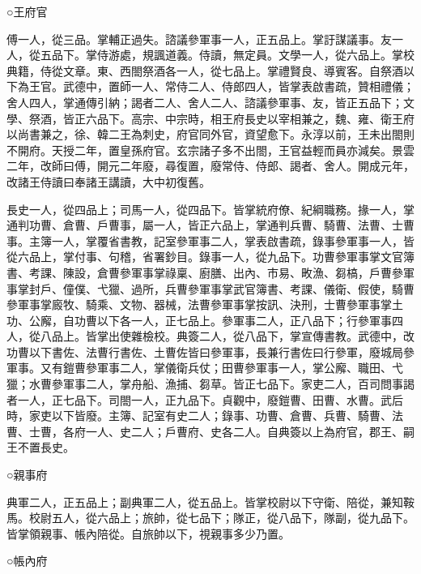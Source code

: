 
\begin{pinyinscope}

 ○王府官



 傅一人，從三品。掌輔正過失。諮議參軍事一人，正五品上。掌訏謀議事。友一人，從五品下。掌侍游處，規諷道義。侍讀，無定員。文學一人，從六品上。掌校典籍，侍從文章。東、西閤祭酒各一人，從七品上。掌禮賢良、導賓客。自祭酒以下為王官。武德中，置師一人、常侍二人、侍郎四人，皆掌表啟書疏，贊相禮儀；舍人四人，掌通傳引納；謁者二人、舍人二人、諮議參軍事、友，皆正五品下；文學、祭酒，皆正六品下。高宗、中宗時，相王府長史以宰相兼之，魏、雍、衛王府以尚書兼之，徐、韓二王為刺史，府官同外官，資望愈下。永淳以前，王未出閤則不開府。天授二年，置皇孫府官。玄宗諸子多不出閤，王官益輕而員亦減矣。景雲二年，改師曰傅，開元二年廢，尋復置，廢常侍、侍郎、謁者、舍人。開成元年，改諸王侍讀曰奉諸王講讀，大中初復舊。



 長史一人，從四品上；司馬一人，從四品下。皆掌統府僚、紀綱職務。掾一人，掌通判功曹、倉曹、戶曹事，屬一人，皆正六品上，掌通判兵曹、騎曹、法曹、士曹事。主簿一人，掌覆省書教，記室參軍事二人，掌表啟書疏，錄事參軍事一人，皆從六品上，掌付事、句稽，省署鈔目。錄事一人，從九品下。功曹參軍事掌文官簿書、考課、陳設，倉曹參軍事掌祿稟、廚膳、出內、市易、畋漁、芻槁，戶曹參軍事掌封戶、僮僕、弋獵、過所，兵曹參軍事掌武官簿書、考課、儀衛、假使，騎曹參軍事掌廄牧、騎乘、文物、器械，法曹參軍事掌按訊、決刑，士曹參軍事掌土功、公廨，自功曹以下各一人，正七品上。參軍事二人，正八品下；行參軍事四人，從八品上。皆掌出使雜檢校。典簽二人，從八品下，掌宣傳書教。武德中，改功曹以下書佐、法曹行書佐、土曹佐皆曰參軍事，長兼行書佐曰行參軍，廢城局參軍事。又有鎧曹參軍事二人，掌儀衛兵仗；田曹參軍事一人，掌公廨、職田、弋獵；水曹參軍事二人，掌舟船、漁捕、芻草。皆正七品下。家吏二人，百司問事謁者一人，正七品下。司閤一人，正九品下。貞觀中，廢鎧曹、田曹、水曹。武后時，家吏以下皆廢。主簿、記室有史二人；錄事、功曹、倉曹、兵曹、騎曹、法曹、士曹，各府一人、史二人；戶曹府、史各二人。自典簽以上為府官，郡王、嗣王不置長史。



 ○親事府



 典軍二人，正五品上；副典軍二人，從五品上。皆掌校尉以下守衛、陪從，兼知鞍馬。校尉五人，從六品上；旅帥，從七品下；隊正，從八品下，隊副，從九品下。皆掌領親事、帳內陪從。自旅帥以下，視親事多少乃置。



 ○帳內府




\end{pinyinscope}
